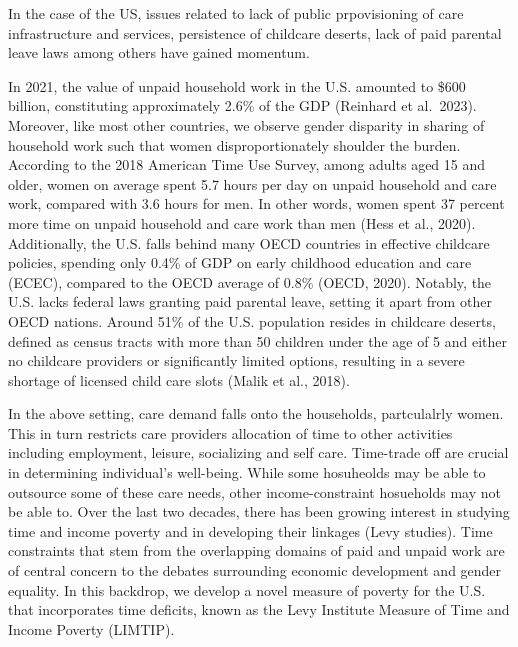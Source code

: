\documentclass[
  11pt,
]{article}
\begin{document}
In the case of the US, issues related to lack of public prpovisioning of
care infrastructure and services, persistence of childcare deserts, lack
of paid parental leave laws among others have gained momentum.

In 2021, the value of unpaid household work in the U.S. amounted to
\$600 billion, constituting approximately 2.6\% of the GDP (Reinhard et
al.~2023). Moreover, like most other countries, we observe gender
disparity in sharing of household work such that women
disproportionately shoulder the burden. According to the 2018 American
Time Use Survey, among adults aged 15 and older, women on average spent
5.7 hours per day on unpaid household and care work, compared with 3.6
hours for men. In other words, women spent 37 percent more time on
unpaid household and care work than men (Hess et al., 2020).
Additionally, the U.S. falls behind many OECD countries in effective
childcare policies, spending only 0.4\% of GDP on early childhood
education and care (ECEC), compared to the OECD average of 0.8\% (OECD,
2020). Notably, the U.S. lacks federal laws granting paid parental
leave, setting it apart from other OECD nations. Around 51\% of the U.S.
population resides in childcare deserts, defined as census tracts with
more than 50 children under the age of 5 and either no childcare
providers or significantly limited options, resulting in a severe
shortage of licensed child care slots (Malik et al., 2018).

In the above setting, care demand falls onto the households,
partculalrly women. This in turn restricts care providers allocation of
time to other activities including employment, leisure, socializing and
self care. Time-trade off are crucial in determining individual's
well-being. While some hosuheolds may be able to outsource some of these
care needs, other income-constraint hosueholds may not be able to. Over
the last two decades, there has been growing interest in studying time
and income poverty and in developing their linkages (Levy studies). Time
constraints that stem from the overlapping domains of paid and unpaid
work are of central concern to the debates surrounding economic
development and gender equality. In this backdrop, we develop a novel
measure of poverty for the U.S. that incorporates time deficits, known
as the Levy Institute Measure of Time and Income Poverty (LIMTIP).
\end{document}
